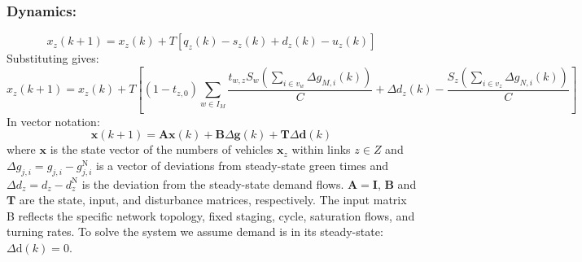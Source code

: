 \documentclass[11pt]{article}
\begin{document}
\subsubsection*{Dynamics:}
\begin{equation}
x_{z}(k+1)=x_{z}(k)+T\left[q_{z}(k)-s_{z}(k)+d_{z}(k)-u_{z}(k)\right]
\end{equation}
Substituting gives:
\begin{equation}
x_{z}(k+1) =x_{z}(k)+T\left[\left(1-t_{z, 0}\right) \sum_{w \in I_{M}} \frac{t_{w, z} S_{w}\left(\sum_{i \in v_{w}} \Delta g_{M, i}(k)\right)}{C} +\Delta d_{z}(k)-\frac{S_{z}\left(\sum_{i \in v_{z}} \Delta g_{N, i}(k)\right)}{C} \right]
\end{equation}
In vector notation: 
\begin{equation}
\mathbf{x}(k+1)=\mathbf{A} \mathbf{x}(k)+\mathbf{B} \Delta \mathbf{g}(k)+\mathbf{T} \Delta \mathbf{d}(k)
\end{equation}
where $ \mathbf{x} $ is the state vector of the numbers of vehicles $ \mathbf{x}_z$ within links $z \in Z$ and $\Delta g_{j, i}=g_{j, i}-g_{j, i}^{\mathrm{N}}$ is a vector of deviations from steady-state green times and $\Delta d_{z}=d_{z}-d_{z}^{\mathrm{N}}$ is the deviation from the steady-state demand flows. $\mathbf{A}= \mathbf{I}$, $\mathbf{B}$ and  $\mathbf{T}$ are the state, input, and disturbance matrices, respectively. The input matrix B reflects the specific network topology, fixed staging, cycle, saturation flows, and turning rates. To solve the system we assume demand is in its steady-state: $\Delta \mathrm{d}(k)=0$.
\end{document}
